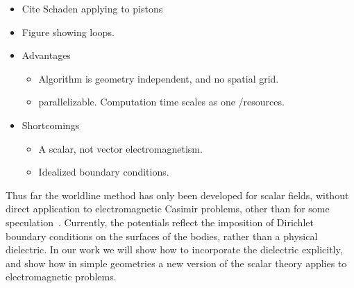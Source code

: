 \begin{itemize}
\item Cite Schaden applying to pistons\cite{Schaden2009}
\item Figure showing loops.  
\item Advantages
  \begin{itemize}
  \item Algorithm is geometry independent, and no spatial grid.
  \item parallelizable.  Computation time scales as one /resources.  
  \end{itemize}

\item Shortcomings
\begin{itemize}
  \item A scalar, not vector electromagnetism.
  \item Idealized boundary conditions.  
\end{itemize}
  
\end{itemize}


Thus far the worldline method has only been developed for scalar fields, 
without direct application to electromagnetic Casimir problems, 
other than for some speculation~\cite{Aehlig2011}.
  Currently, the potentials reflect the imposition of Dirichlet boundary 
conditions on the surfaces of the bodies, rather than a physical dielectric.
   In our work we will show how to incorporate the dielectric explicitly, 
and show how in simple geometries a new version of the scalar theory applies
 to electromagnetic problems.  

